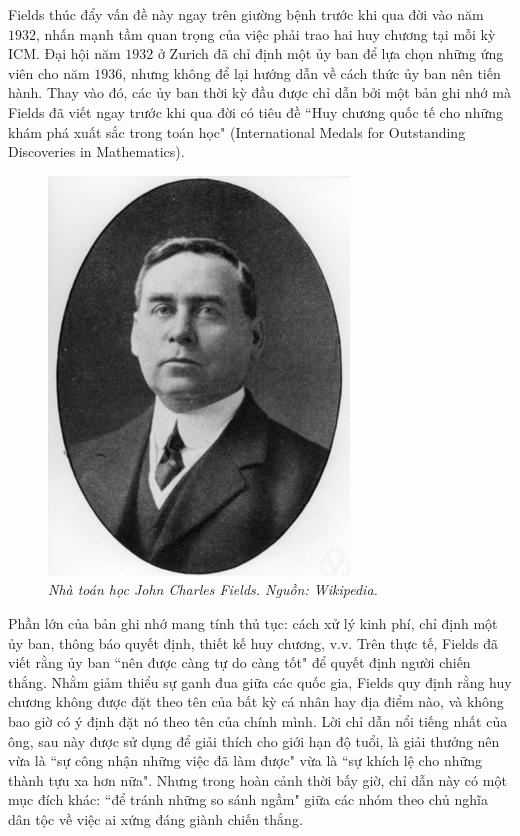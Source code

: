\begin{multicols}{2}
	\vskip 0.1cm
	Fields thúc đẩy vấn đề này ngay trên giường bệnh trước khi qua đời vào năm $1932$, nhấn mạnh tầm quan trọng của việc phải trao hai huy chương tại mỗi kỳ ICM. Đại hội năm $1932$ ở Zurich đã chỉ định một ủy ban để lựa chọn những ứng viên cho năm $1936$, nhưng không để lại hướng dẫn về cách thức ủy ban nên tiến hành. Thay vào đó, các ủy ban thời kỳ đầu được chỉ dẫn bởi một bản ghi nhớ mà Fields đã viết ngay trước khi qua đời có tiêu đề ``Huy chương quốc tế cho những khám phá xuất sắc trong toán học" (International Medals for Outstanding Discoveries in Mathematics).
	\begin{figure}[H]
		\vspace*{-5pt}
		\centering
		\captionsetup{labelformat= empty, justification=centering}
		\includegraphics[width= 0.85\linewidth]{John_charles_fields}
		\caption{\small\textit{\color{lichsutoanhoc}Nhà toán học John Charles Fields. Nguồn: Wikipedia.}}
		\vspace*{-10pt}
	\end{figure}
	Phần lớn của bản ghi nhớ mang tính thủ tục: cách xử lý kinh phí, chỉ định một ủy ban, thông báo quyết định, thiết kế huy chương, v.v. Trên thực tế, Fields đã viết rằng ủy ban ``nên được càng tự do càng tốt" để quyết định người chiến thắng. Nhằm giảm thiểu sự ganh đua giữa các quốc gia, Fields quy định rằng huy chương không được đặt theo tên của bất kỳ cá nhân hay địa điểm nào, và không bao giờ có ý định đặt nó theo tên của chính mình. Lời chỉ dẫn nổi tiếng nhất của ông, sau này được sử dụng để giải thích cho giới hạn độ tuổi, là giải thưởng nên vừa là ``sự công nhận những việc đã làm được" vừa là ``sự khích lệ cho những thành tựu xa hơn nữa". Nhưng trong hoàn cảnh thời bấy giờ, chỉ dẫn này có một mục đích khác: ``để tránh những so sánh ngầm" giữa các nhóm theo chủ nghĩa dân tộc về việc ai xứng đáng giành chiến thắng. 

\end{multicols}
